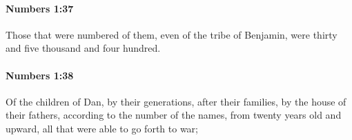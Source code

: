 		\paragraph{Numbers 1:37} %
			\label{NUMBERS-1-37}

			Those that were numbered of them, even of the tribe of Benjamin, were thirty and five thousand and four hundred.


		\paragraph{Numbers 1:38} %
			\label{NUMBERS-1-38}

			Of the children of Dan, by their generations, after their families, by the house of their fathers, according to the number of the names, from twenty years old and upward, all that were able to go forth to war;


